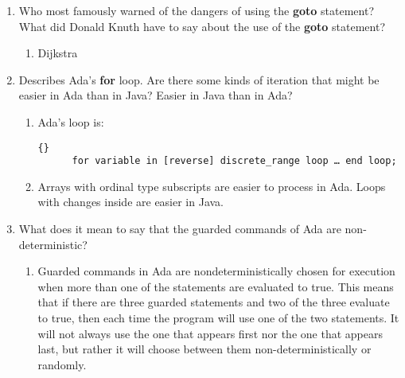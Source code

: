 \begin{enumerate}
\begin{answer}
    \end{answer}
  
  \item Who most famously warned of the dangers of using the
    \textbf{goto} statement? What did Donald Knuth have to
    say about the use of the \textbf{goto} statement?
    
   \begin{answer}
   \begin{enumerate}
    \item  Dijkstra
    \end{enumerate}

    \end{answer}

  \item Describes Ada's \textbf{for} loop. Are there some
    kinds of iteration that might be easier in Ada than
    in Java? Easier in Java than in Ada?

    \begin{answer}
    \begin{enumerate}
    \item  Ada's loop is: 
      \begin{lstlisting}{} 
      for variable in [reverse] discrete_range loop … end loop; 
      \end{lstlisting}

     \item  Arrays with ordinal type subscripts are easier to process in Ada.
       Loops with changes inside are easier in Java.
    \end{enumerate}

    \end{answer}
  
  \item What does it mean to say that the guarded commands
    of Ada are non-deterministic?

    \begin{answer}
    \begin{enumerate}
    \item Guarded commands in Ada are nondeterministically chosen for
      execution when more than one of the statements are evaluated to
      true. This means that if there are three guarded statements and
      two of the three evaluate to true, then each time the program
      will use one of the two statements. It will not always use the
      one that appears first nor the one that appears last, but rather
      it will choose between them non-deterministically or randomly.
    \end{enumerate}


\end{answer}
\end{enumerate}
